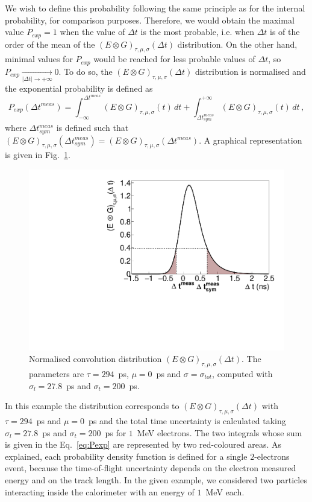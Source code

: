 We wish to define this probability following the same principle as for the internal probability, for comparison purposes.
Therefore, we would obtain the maximal value ${P_{exp}=1}$ when the value of $\Delta t$ is the most probable, i.e. when $\Delta t$ is of the order of the mean of the ${(E \otimes G)_{\tau,\mu,\sigma}(\Delta t)}$ distribution.
On the other hand, minimal values for $P_{exp}$ would be reached for less probable values of $\Delta t$, so ${P_{exp} \xrightarrow[|\Delta t| \rightarrow +\infty]{} 0}$.
To do so, the ${(E \otimes G)_{\tau,\mu,\sigma}(\Delta t)}$ distribution is normalised and the exponential probability is defined as
\begin{equation}
  P_{exp}(\Delta t^{meas}) = \int_{-\infty}^{\Delta t^{meas}} (E \otimes G)_{\tau,\mu,\sigma}(t)\, dt + \int_{\Delta t_{sym}^{meas}}^{+\infty} (E \otimes G)_{\tau,\mu,\sigma}(t)\, dt\,,
  \label{eq:Pexp}
\end{equation}
where $\Delta t^{meas}_{sym}$ is defined such that ${(E \otimes G)_{\tau,\mu,\sigma}(\Delta t^{meas}_{sym})} = {(E \otimes G)_{\tau,\mu,\sigma}(\Delta t^{meas})}$.
A graphical representation is given in Fig.~\ref{fig:Pexp}.
\begin{figure}[!h]
  \centering
  \includegraphics[width=13cm]{timedifference/fig_timediff/proba_expo_test.pdf}
  \caption{Normalised convolution distribution ${(E \otimes G)_{\tau,\mu,\sigma}(\Delta t)}$.
    The parameters are $\tau=294$~ps, $\mu=0$~ps and $\sigma=\sigma_{tot}$, computed with $\sigma_{l}=27.8$~ps and $\sigma_{t}=200$~ps.
    \label{fig:Pexp}}
\end{figure}
In this example the distribution corresponds to ${(E \otimes G)_{\tau,\mu,\sigma}(\Delta t)}$ with ${\tau=294}$~ps and ${\mu=0}$~ps and the total time uncertainty is calculated taking $\sigma_{l}=27.8$~ps and $\sigma_{t}=200$~ps for $1$~MeV electrons.
The two integrals whose sum is given in the Eq.~\eqref{eq:Pexp} are represented by two red-coloured areas.
As explained, each probability density function is defined for a single $2$-electrons event, because the time-of-flight uncertainty depends on the electron measured energy and on the track length.
In the given example, we considered two particles interacting inside the calorimeter with an energy of $1$~MeV each.

